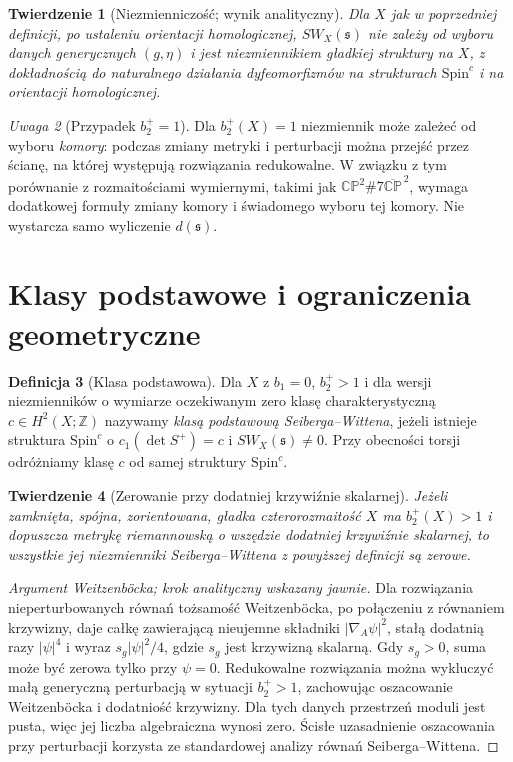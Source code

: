 \documentclass[11pt,a4paper]{report}
\numberwithin{equation}{section}
\theoremstyle{plain}
\newtheorem{twierdzenie}{Twierdzenie}[section]
\theoremstyle{definition}
\newtheorem{definicja}[twierdzenie]{Definicja}
\theoremstyle{remark}
\newtheorem{uwaga}[twierdzenie]{Uwaga}
\begin{document}
\begin{twierdzenie}[Niezmienniczość; wynik analityczny]
Dla $X$ jak w poprzedniej definicji, po ustaleniu
orientacji homologicznej, $SW_X(\mathfrak s)$ nie zależy
od wyboru danych generycznych $(g,\eta)$ i jest
niezmiennikiem gładkiej struktury na $X$, z dokładnością
do naturalnego działania dyfeomorfizmów na strukturach
$\mathrm{Spin}^c$ i na orientacji homologicznej.
\end{twierdzenie}

\begin{uwaga}[Przypadek $b_2^+=1$]
Dla $b_2^+(X)=1$ niezmiennik może zależeć od wyboru
\emph{komory}: podczas zmiany metryki i perturbacji
można przejść przez ścianę, na której występują
rozwiązania redukowalne. W związku z tym porównanie
z rozmaitościami wymiernymi, takimi jak
$\mathbb{CP}^2\#7\overline{\mathbb{CP}}^{\,2}$,
wymaga dodatkowej formuły zmiany komory i świadomego
wyboru tej komory. Nie wystarcza samo wyliczenie
$d(\mathfrak s)$.
\end{uwaga}

\section{Klasy podstawowe i ograniczenia geometryczne}
\label{sec:tg-sw-basic}

\begin{definicja}[Klasa podstawowa]
Dla $X$ z $b_1=0$, $b_2^+>1$ i dla wersji
niezmienników o wymiarze oczekiwanym zero klasę
charakterystyczną $c\in H^2(X;\mathbb Z)$
nazywamy \emph{klasą podstawową Seiberga--Wittena},
jeżeli istnieje struktura $\mathrm{Spin}^c$ o
$c_1(\det S^+)=c$ i $SW_X(\mathfrak s)\ne0$.
Przy obecności torsji odróżniamy klasę $c$ od samej
struktury $\mathrm{Spin}^c$.
\end{definicja}

\begin{twierdzenie}[Zerowanie przy dodatniej krzywiźnie skalarnej]
\label{thm:tg-sw-psc}
Jeżeli zamknięta, spójna, zorientowana,
gładka czterorozmaitość $X$ ma $b_2^+(X)>1$
i dopuszcza metrykę riemannowską o wszędzie dodatniej
krzywiźnie skalarnej, to wszystkie jej niezmienniki
Seiberga--Wittena z powyższej definicji są zerowe.
\end{twierdzenie}

\begin{proof}[Argument Weitzenböcka; krok analityczny wskazany jawnie]
Dla rozwiązania nieperturbowanych równań tożsamość
Weitzenböcka, po połączeniu z równaniem krzywizny,
daje całkę zawierającą nieujemne składniki
$|\nabla_A\psi|^2$, stałą dodatnią razy $|\psi|^4$
i wyraz $s_g|\psi|^2/4$, gdzie $s_g$ jest krzywizną
skalarną. Gdy $s_g>0$, suma może być zerowa tylko
przy $\psi=0$. Redukowalne rozwiązania można wykluczyć
małą generyczną perturbacją w sytuacji $b_2^+>1$,
zachowując oszacowanie Weitzenböcka i dodatniość krzywizny.
Dla tych danych przestrzeń moduli jest pusta, więc
jej liczba algebraiczna wynosi zero.
Ścisłe uzasadnienie oszacowania przy perturbacji
korzysta ze standardowej analizy równań Seiberga--Wittena.
\end{proof}
\end{document}
